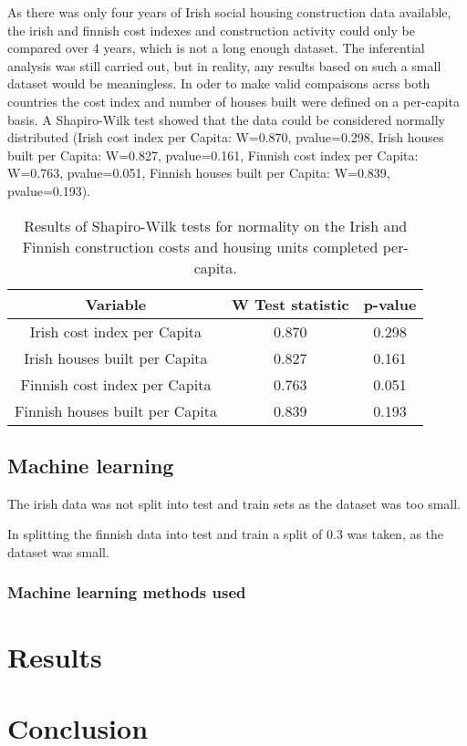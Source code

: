 \documentclass[hidelinks,12pt,oneside]{report} %
\begin{document}
As there was only four years of Irish social housing construction data available, the irish and finnish cost indexes and construction activity could only be compared over 4 years, which is not a long enough dataset. The inferential analysis was still carried out, but in reality, any results based on such a small dataset would be meaningless. In oder to make valid compaisons acrss both countries the cost index and number of houses built were defined on a per-capita basis. A Shapiro-Wilk test showed that the data could be considered normally distributed (Irish cost index per Capita: W=0.870, pvalue=0.298, Irish houses built per Capita: W=0.827, pvalue=0.161, Finnish cost index per Capita: W=0.763, pvalue=0.051, Finnish houses built per Capita: W=0.839, pvalue=0.193).

\begin{table}[h!]
\centering
\begin{tabular}{||c | c | c ||} 
 \hline
 Variable & W Test statistic & p-value \\ [0.0ex] 
 \hline\hline
 Irish cost index per Capita & 0.870 & 0.298 \\ 
 \hline
 Irish houses built per Capita & 0.827 & 0.161 \\
 \hline
 Finnish cost index per Capita & 0.763 & 0.051 \\
 \hline
  Finnish houses built per Capita & 0.839 & 0.193 \\ [0.0ex] 
 \hline
\end{tabular}
\caption{Results of Shapiro-Wilk tests for normality on the Irish and Finnish construction costs and housing units completed per-capita.}
\label{table:1}
\end{table}
 
\section{Machine learning}
The irish data was not split into test and train sets as the dataset was too small.

In splitting the finnish data into test and train a split of 0.3 was taken, as the dataset was small.

\subsection{Machine learning methods used}

\chapter{Results}

\chapter{Conclusion}


\printbibliography
 
\end{document}
